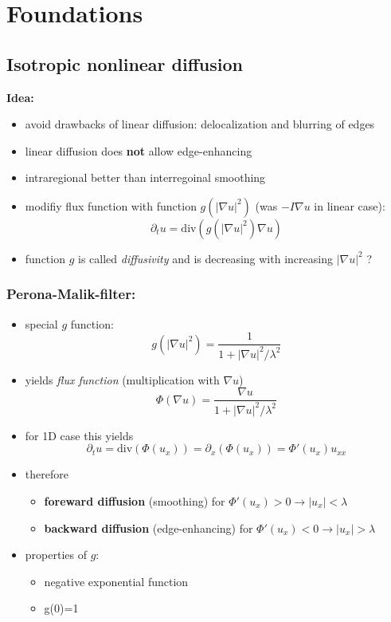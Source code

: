 \documentclass[11pt]{article}
\begin{document}
\section{Foundations}
\label{sec-7}
\subsection{Isotropic nonlinear diffusion}
\label{sec-7-1}
\textbf{Idea:}
\begin{itemize}
\item avoid drawbacks of linear diffusion: delocalization and blurring of edges
\item linear diffusion does \textbf{not} allow edge-enhancing
\item intraregional better than interregoinal smoothing
\item modifiy flux function with function $g(|\nabla u|^2)$ (was $-I\nabla u$ in linear case):
     \[ \partial_t u = \text{div}(g(|\nabla u|^2) \nabla u) \]
\item function $g$ is called \emph{diffusivity} and is decreasing with increasing $|\nabla u|^2$ ?
\end{itemize}

\subsubsection{Perona-Malik-filter:}
\label{sec-7-1-1}
\begin{itemize}
\item special $g$ function:
     \[ g(|\nabla u|^2) = \frac{1}{1+|\nabla u|^2/\lambda^2} \]
\item yields \emph{flux function} (multiplication with $\nabla u$)
     \[ \Phi(\nabla u) = \frac{\nabla u}{1+|\nabla u|^2/\lambda^2} \]
\item for 1D case this yields
     \[ \partial_t u = \text{div}(\Phi(u_x)) = \partial_x(\Phi(u_x)) = \Phi'(u_x)u_{xx} \]
\item therefore
\begin{itemize}
\item \textbf{foreward diffusion} (smoothing) for $\Phi'(u_x) >0 \rightarrow |u_x| < \lambda$
\item \textbf{backward diffusion} (edge-enhancing) for $\Phi'(u_x) <0 \rightarrow |u_x| > \lambda$
\end{itemize}
\item properties of $g$:
\begin{itemize}
\item negative exponential function
\item g(0)=1
\end{itemize}
\end{itemize}
\end{document}
